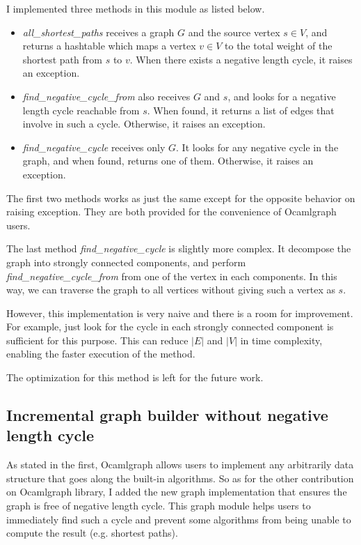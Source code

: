 \documentclass[a4paper,12pt]{article}
\begin{document}
I implemented three methods in this module as listed below.

\begin{itemize}
\item \emph{all\_shortest\_paths} receives a graph $G$ and the source
  vertex $s\in V$, and returns a hashtable which maps a vertex $v\in
  V$ to the total weight of the shortest path from $s$ to $v$. When
  there exists a negative length cycle, it raises an exception.

\item \emph{find\_negative\_cycle\_from} also receives $G$ and $s$, and
  looks for a negative length cycle reachable from $s$. When found, it
  returns a list of edges that involve in such a cycle. Otherwise, it
  raises an exception.

\item \emph{find\_negative\_cycle} receives only $G$. It looks for any
  negative cycle in the graph, and when found, returns one of
  them. Otherwise, it raises an exception.
\end{itemize}

The first two methods works as just the same except for the opposite
behavior on raising exception.  They are both provided for the
convenience of Ocamlgraph users.

The last method \emph{find\_negative\_cycle} is slightly more
complex. It decompose the graph into strongly connected components,
and perform \emph{find\_negative\_cycle\_from} from one of the vertex in
each components. In this way, we can traverse the graph to all
vertices without giving such a vertex as $s$.

However, this implementation is very naive and there is a room for
improvement. For example, just look for the cycle in each strongly
connected component is sufficient for this purpose. This can reduce
$|E|$ and $|V|$ in time complexity, enabling the faster execution of
the method.

The optimization for this method is left for the future work.

\subsection{Incremental graph builder without negative length cycle}

As stated in the first, Ocamlgraph allows users to implement any
arbitrarily data structure that goes along the built-in algorithms. So
as for the other contribution on Ocamlgraph library, I added the new
graph implementation that ensures the graph is free of negative length
cycle. This graph module helps users to immediately find such a cycle
and prevent some algorithms from being unable to compute the result
(e.g. shortest paths).
\end{document}

